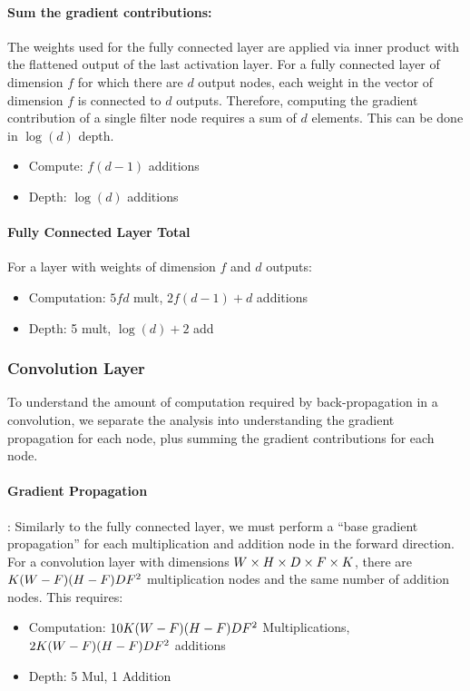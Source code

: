 \paragraph{Sum the gradient contributions:}
The weights used for the fully connected layer are applied via inner product with the flattened output of the last activation layer. 
For a fully connected layer of dimension $f$ for which there are $d$ output nodes, each weight in the vector of dimension $f$ is connected to $d$ outputs. Therefore, computing the gradient contribution of a single filter node requires a sum of $d$ elements. This can be done in $\log(d)$ depth.
\begin{itemize}
	\item Compute: $f(d-1)$ additions
	\item Depth: $\log(d)$ additions
\end{itemize}



\paragraph{Fully Connected Layer Total}
For a layer with weights of dimension $f$ and $d$ outputs:
\begin{itemize}
	\item Computation: $5fd$ mult, $2f(d-1)+d$ additions
	\item Depth: 5 mult, $\log(d)+2$ add
\end{itemize}

\subsubsection{Convolution Layer}
To understand the amount of computation required by back-propagation in a convolution, we separate the analysis into understanding the gradient propagation for each node, plus summing the gradient contributions for each node.

\paragraph{Gradient Propagation}:
Similarly to the fully connected layer, we must perform a ``base gradient propagation'' for each multiplication and addition node in the forward direction. For
 a convolution layer with dimensions $W \times H \times D \times F \times K$, there are $K(W-F)(H-F)DF^{2}$  multiplication nodes and the same number of addition nodes. This requires:
\begin{itemize}
	\item Computation: $10K(W-F)(H-F)DF^{2}$  Multiplications,
	$2K(W-F)(H-F)DF^{2}$ additions
	\item Depth: 5 Mul, 1 Addition
\end{itemize}

